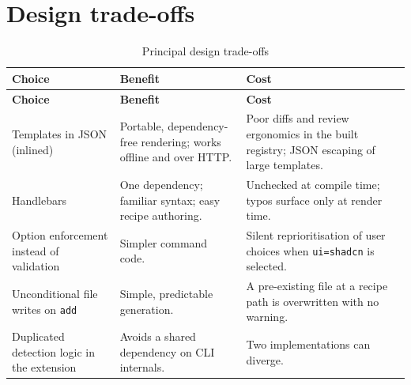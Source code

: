 \section{Design trade-offs}

\begin{longtable}{@{}L{4.6cm}L{4.4cm}L{5cm}@{}}
\caption{Principal design trade-offs}\\
\toprule
\textbf{Choice} & \textbf{Benefit} & \textbf{Cost} \\
\midrule
\endfirsthead
\toprule
\textbf{Choice} & \textbf{Benefit} & \textbf{Cost} \\
\midrule
\endhead
Templates in JSON (inlined) & Portable, dependency-free rendering; works offline and over HTTP. & Poor diffs and review ergonomics in the built registry; JSON escaping of large templates. \\
Handlebars & One dependency; familiar syntax; easy recipe authoring. & Unchecked at compile time; typos surface only at render time. \\
Option enforcement instead of validation & Simpler command code. & Silent reprioritisation of user choices when \texttt{ui=shadcn} is selected. \\
Unconditional file writes on \texttt{add} & Simple, predictable generation. & A pre-existing file at a recipe path is overwritten with no warning. \\
Duplicated detection logic in the extension & Avoids a shared dependency on CLI internals. & Two implementations can diverge. \\
\bottomrule
\end{longtable}
